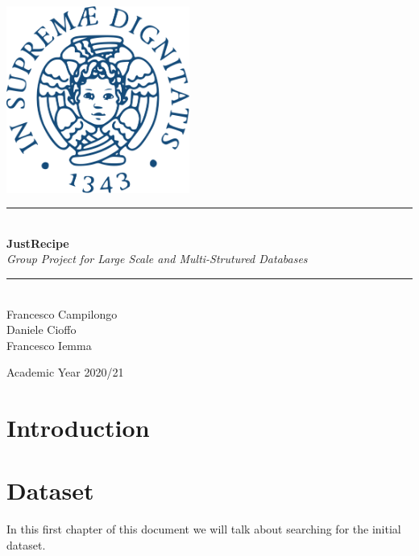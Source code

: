 \documentclass[a4paper]{report}
\newcommand{\HRule}{\rule{\linewidth}{0.5mm}}
\begin{document}
\begin{titlepage}
	\begin{center}
		
		\includegraphics[width=0.45\textwidth]{img/unipi.png}~\\[2.5cm]
		
		
		\HRule \\[0.4cm]
		{ \LARGE 
			\textbf{JustRecipe}\\[0.4cm]
			\emph{Group Project for Large Scale and Multi-Strutured Databases}\\[0.4cm]
		}
		\HRule \\[1.5cm]
		
		
		
		{ \large
			Francesco Campilongo \\[0.1cm]
			Daniele Cioffo \\[0.1cm]
			Francesco Iemma \\[0.1cm]
		}
		
		\vfill

		
		
		{\large Academic Year 2020/21}
		
	\end{center}
\end{titlepage}


\tableofcontents

\chapter*{Introduction}

\chapter{Dataset}
In this first chapter of this document we will talk about searching for the initial dataset.
\end{document}
